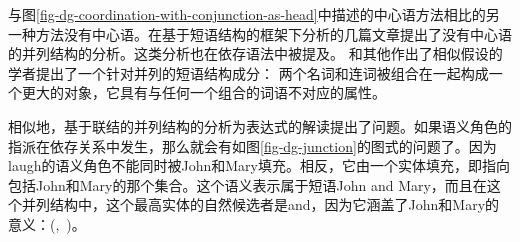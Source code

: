 与图\ref{fig-dg-coordination-with-conjunction-as-head}中描述的中心语方法相比的另一种方法没有中心语。在基于短语结构的框架下分析的几篇文章提出了没有中心语的并列结构的分析。这类分析也在依存语法中被提及\citep{Hudson88a,Kahane97a}。 \citet{Hudson88a}和其他作出了相似假设的学者提出了一个针对并列的短语结构成分：
两个名词和连词被组合在一起构成一个更大的对象，它具有与任何一个组合的词语不对应的属性。

相似地，基于联结的并列结构的分析为表达式的解读提出了问题。如果语义角色的指派在依存关系中发生，那么就会有如图\ref{fig-dg-junction}的图式的问题了。因为laugh的语义角色不能同时被John和Mary填充。相反，它由一个实体填充，即指向包括John和Mary的那个集合。这个语义表示属于短语John and Mary，而且在这个并列结构中，这个最高实体的自然候选者是and，因为它涵盖了John和Mary的意义：(,~)。

